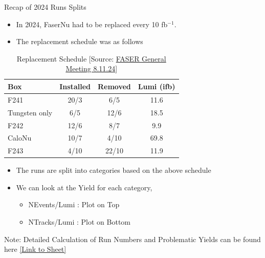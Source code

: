 \begin{frame}{Recap of 2024 Runs Splits}
    \begin{itemize}
        \item In 2024, FaserNu had to be replaced every 10 fb$^{-1}$.
        \item The replacement schedule was as follows
    \end{itemize}
    \begin{table}[h!]
        \begin{tabular}{|l|c|c|c|}
            \hline
            \textbf{Box}  & \textbf{Installed} & \textbf{Removed} & \textbf{Lumi (ifb)} \\ \hline
            F241          & 20/3               & 6/5              & 11.6                \\ \hline
            Tungsten only & 6/5                & 12/6             & 18.5                \\ \hline
            F242          & 12/6               & 8/7              & 9.9                 \\ \hline
            CaloNu        & 10/7               & 4/10             & 69.8                \\ \hline
            F243          & 4/10               & 22/10            & 11.9                \\ \hline
        \end{tabular}
        \caption{Replacement Schedule [Source: \href{https://indico.cern.ch/event/1350805/contributions/5686417/attachments/2963344/5212652/FASER-GeneralMtg-8.11.24.pdf}{FASER General Meeting 8.11.24}]}
    \end{table}
	\vspace{-0.5cm}
    \begin{itemize}
        \item The runs are split into categories based on the above schedule
        \item We can look at the Yield for each category, 
		\begin{itemize}
			\item NEvents/Lumi : Plot on Top
			\item  NTracks/Lumi : Plot on Bottom
		\end{itemize}
    \end{itemize}
    \tiny{Note: Detailed Calculation of Run Numbers and Problematic Yields can be found here \href{https://docs.google.com/spreadsheets/d/1nnYFcmhVieSHI5XAVhPiW1K6CoGYGxv2YPchwL0sqH4/edit?usp=sharing}{[Link to Sheet]}}
\end{frame}

